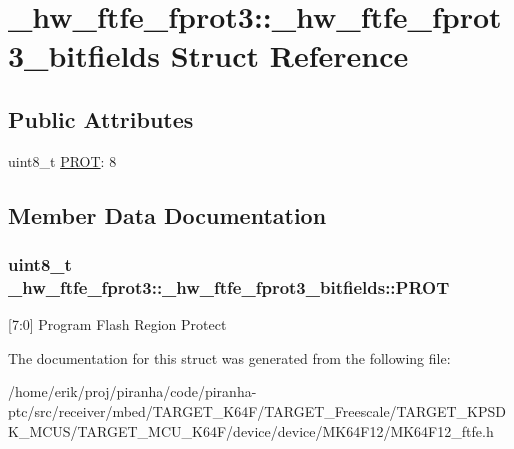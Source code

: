 \hypertarget{struct__hw__ftfe__fprot3_1_1__hw__ftfe__fprot3__bitfields}{}\section{\+\_\+hw\+\_\+ftfe\+\_\+fprot3\+:\+:\+\_\+hw\+\_\+ftfe\+\_\+fprot3\+\_\+bitfields Struct Reference}
\label{struct__hw__ftfe__fprot3_1_1__hw__ftfe__fprot3__bitfields}
\subsection*{Public Attributes}
\begin{DoxyCompactItemize}
\item 
uint8\+\_\+t \hyperlink{struct__hw__ftfe__fprot3_1_1__hw__ftfe__fprot3__bitfields_a58be2e695e4e3152ca3c58e1249fc3a6}{P\+R\+OT}\+: 8
\end{DoxyCompactItemize}


\subsection{Member Data Documentation}
\subsubsection[{\texorpdfstring{P\+R\+OT}{PROT}}]{\setlength{\rightskip}{0pt plus 5cm}uint8\+\_\+t \+\_\+hw\+\_\+ftfe\+\_\+fprot3\+::\+\_\+hw\+\_\+ftfe\+\_\+fprot3\+\_\+bitfields\+::\+P\+R\+OT}\hypertarget{struct__hw__ftfe__fprot3_1_1__hw__ftfe__fprot3__bitfields_a58be2e695e4e3152ca3c58e1249fc3a6}{}\label{struct__hw__ftfe__fprot3_1_1__hw__ftfe__fprot3__bitfields_a58be2e695e4e3152ca3c58e1249fc3a6}
\mbox{[}7\+:0\mbox{]} Program Flash Region Protect 

The documentation for this struct was generated from the following file\+:\begin{DoxyCompactItemize}
\item 
/home/erik/proj/piranha/code/piranha-\/ptc/src/receiver/mbed/\+T\+A\+R\+G\+E\+T\+\_\+\+K64\+F/\+T\+A\+R\+G\+E\+T\+\_\+\+Freescale/\+T\+A\+R\+G\+E\+T\+\_\+\+K\+P\+S\+D\+K\+\_\+\+M\+C\+U\+S/\+T\+A\+R\+G\+E\+T\+\_\+\+M\+C\+U\+\_\+\+K64\+F/device/device/\+M\+K64\+F12/M\+K64\+F12\+\_\+ftfe.\+h\end{DoxyCompactItemize}
